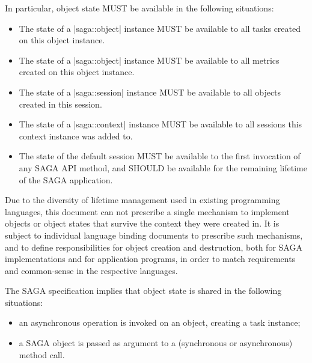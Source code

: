    In particular, object state MUST be available in the
   following situations:

   \begin{itemize}

     \item The state of a |saga::object| instance MUST 
           be available to all tasks created on this object 
           instance.

     \item The state of a |saga::object| instance MUST 
           be available to all metrics created on this object 
           instance.

     \item The state of a |saga::session| instance MUST 
           be available to all objects created in this session.

     \item The state of a |saga::context| instance MUST 
           be available to all sessions this context instance 
           was added to.

     \item The state of the default session MUST be 
           available to the first invocation of any SAGA API 
           method, and SHOULD be available for the remaining 
           lifetime of the SAGA application.

   \end{itemize}

   Due to the diversity of lifetime management used in existing
   programming languages, this document can not prescribe a
   single mechanism to implement objects or object states that
   survive the context they were created in.  It is subject to
   individual language binding documents to prescribe such
   mechanisms, and to define responsibilities for object
   creation and destruction, both for SAGA implementations and
   for application programs, in order to match requirements and
   common-sense in the respective languages.

   The SAGA specification implies that object state is shared in
   the following situations:

   \begin{itemize}

     \item an asynchronous operation is invoked on an object, 
           creating a task instance;

     \item a SAGA object is passed as argument to a 
           (synchronous or asynchronous) method call.

   \end{itemize}

